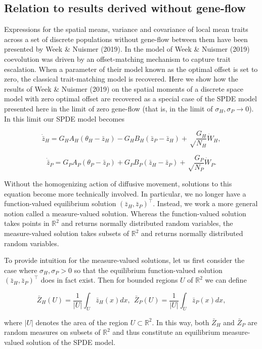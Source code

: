 \documentclass{article}
\begin{document}
\hypertarget{relation-to-results-derived-without-gene-flow}{%
\subsection{Relation to results derived without
gene-flow}\label{relation-to-results-derived-without-gene-flow}}

Expressions for the spatial means, variance and covariance of local mean
traits across a set of discrete populations without gene-flow between
them have been presented by Week \& Nuismer (2019). In the model of Week
\& Nuismer (2019) coevolution was driven by an offset-matching mechanism
to capture trait escalation. When a parameter of their model known as
the optimal offset is set to zero, the classical trait-matching model is
recovered. Here we show how the results of Week \& Nuismer (2019) on the
spatial moments of a discrete space model with zero optimal offset are
recovered as a special case of the SPDE model presented here in the
limit of zero gene-flow (that is, in the limit of
\(\sigma_H,\sigma_P\to0\)). In this limit our SPDE model becomes

\[\dot{\bar z}_H=G_HA_H(\theta_H-\bar z_H)-G_HB_H(\bar z_P-\bar z_H)+\sqrt\frac{G_H}{N_H}\dot W_H,\]

\[\dot{\bar z}_P=G_PA_P(\theta_P-\bar z_P)+G_PB_P(\bar z_H-\bar z_P)+\sqrt\frac{G_P}{N_P}\dot W_P.\]

Without the homogenizing action of diffusive movement, solutions to this
equation become more technically involved. In particular, we no longer
have a function-valued equilibrium solution
\((\bar z_H,\bar z_P)^\top\). Instead, we work a more general notion
called a measure-valued solution. Whereas the function-valued solution
takes points in \(\mathbb R^2\) and returns normally distributed random
variables, the measure-valued solution takes subsets of \(\mathbb R^2\)
and returns normally distributed random variables.

To provide intuition for the measure-valued solutions, let us first
consider the case where \(\sigma_H,\sigma_P>0\) so that the equilibrium
function-valued solution \((\bar z_H,\bar z_P)^\top\) does in fact
exist. Then for bounded regions \(U\) of \(\mathbb R^2\) we can define

\[\bar Z_H(U)=\frac{1}{|U|}\int_U\bar z_H(x)dx, \ \ \bar Z_P(U)=\frac{1}{|U|}\int_U\bar z_P(x)dx,\]

where \(|U|\) denotes the area of the region \(U\subset\mathbb R^2\). In
this way, both \(\bar Z_H\) and \(\bar Z_P\) are random measures on
subsets of \(\mathbb R^2\) and thus constitute an equilibrium
measure-valued solution of the SPDE model.
\end{document}
